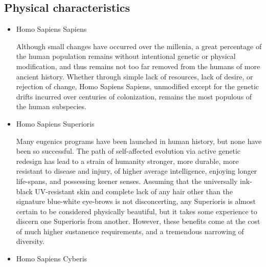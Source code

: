 \subsection{Physical characteristics}
\begin{itemize}
\item Homo Sapiens Sapiens

Although small changes have occurred over the millenia, a great
percentage of the human population remains without intentional genetic
or physical modification, and thus remains not too far removed from
the humans of more ancient history. Whether through simple lack of
resources, lack of desire, or rejection of change, Homo Sapiens
Sapiens, unmodified except for the genetic drifts incurred over
centuries of colonization, remains the most populous of the human
subspecies.

\item Homo Sapiens Superioris

Many eugenics programs have been launched in human history, but none
have been so successful. The path of self-affected evolution via
active genetic redesign has lead to a strain of humanity stronger,
more durable, more resistant to disease and injury, of higher average
intelligence, enjoying longer life-spans, and possessing keener
senses.  Assuming that the universally ink-black UV-resistant skin and
complete lack of any hair other than the signature blue-white
eye-brows is not disconcerting, any Superioris is almost certain to be
considered physically beautiful, but it takes some experience to
discern one Superioris from another. However, these benefits come at
the cost of much higher sustanence requirements, and a tremendous
narrowing of diversity.

\item Homo Sapiens Cyberis


\end{itemize}
